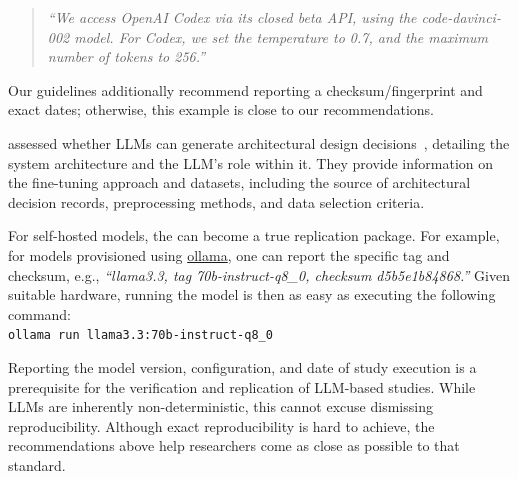 \begin{quote}
\it
``We access OpenAI Codex via its closed beta API, using the code-davinci-002 model. For Codex, we set the temperature to 0.7, and the maximum number of tokens to 256.''
\end{quote}

Our guidelines additionally recommend reporting a checksum/fingerprint and exact dates; otherwise, this example is close to our recommendations.

\citeauthor{DBLP:conf/icsa/DharVV24} assessed whether LLMs can generate architectural design decisions~\cite{DBLP:conf/icsa/DharVV24}, detailing the system architecture and the LLM's role within it.
They provide information on the fine-tuning approach and datasets, including the source of architectural decision records, preprocessing methods, and data selection criteria.

For self-hosted models, the \supplementarymaterial can become a true replication package. For example, for models provisioned using \href{https://ollama.com/library/}{ollama}, one can report the specific tag and checksum, e.g., \emph{``llama3.3, tag 70b-instruct-q8\_0, checksum d5b5e1b84868.''}
Given suitable hardware, running the model is then as easy as executing the following command:\\
\texttt{ollama run llama3.3:70b-instruct-q8\_0}


Reporting the model version, configuration, and date of study execution is a prerequisite for the verification and replication of LLM-based studies. While LLMs are inherently non-deterministic, this cannot excuse dismissing reproducibility. Although exact reproducibility is hard to achieve, the recommendations above help researchers come as close as possible to that standard.


